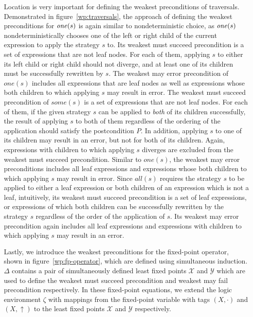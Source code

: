 Location is very important for defining the weakest preconditions of traversals. Demonstrated in figure~\ref{wp:traversals}, the approach of defining the weakest preconditions for $\text{\textit{one}\/}(s)$ is again similar to nondeterministic choice, as $\text{\textit{one}\/}(s)$ nondeterministically chooses one of the left or right child of the current expression to apply the strategy $s$ to. Its weakest must succeed precondition is a set of expressions that are not leaf nodes. For each of them, applying $s$ to either its left child or right child should not diverge, and at least one of its children must be successfully rewritten by $s$. The weakest may error precondition of $\mathit{one}(s)$ includes all expressions that are leaf nodes as well as expressions whose both children to which applying $s$ may result in error.
The weakest must succeed precondition of $\mathit{some}(s)$ is a set of expressions that are not leaf nodes. For each of them, if the given strategy $s$ can be applied to \emph{both} of its children successfully, the result of applying $s$ to both of them regardless of the ordering of the application should satisfy the postcondition $P$. In addition, applying $s$ to one of its children may result in an error, but not for both of its children. Again, expressions with children to which applying $s$ diverges are excluded from the weakest must succeed precondition. Similar to $\mathit{one}(s)$, the weakest may error preconditions includes all leaf expressions and expressions whose both children to which applying $s$ may result in error. Since $\mathit{all}(s)$ requires the strategy $s$ to be applied to either a leaf expression or both children of an expression which is not a leaf, intuitively, its weakest must succeed precondition is a set of leaf expressions, or expressions of which both children can be successfully rewritten by the strategy $s$ regardless of the order of the application of $s$. Its weakest may error precondition again includes all leaf expressions and expressions with children to which applying $s$ may result in an error.

Lastly, we introduce the weakest preconditions for the fixed-point operator, shown in figure~\ref{wp:fp-operator}, which are defined using simultaneous induction. $\Delta$ contains a pair of simultaneously defined least fixed points $\mathscr{X}$ and $\mathscr{Y}$ which are used to define the weakest must succeed precondition and weakest may fail precondition respectively. In these fixed-point equations, we extend the logic environment $\zeta$ with mappings from the fixed-point variable with tags $(X, \cdot)$ and $(X, \uparrow)$ to the least fixed points $\mathscr{X}$ and $\mathscr{Y}$ respectively.

